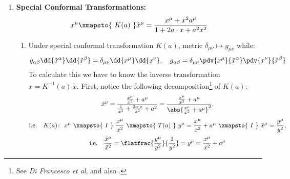 \documentclass[a4paper,10pt]{article}
\begin{document}
\begin{enumerate}
	\item \textbf{Special Conformal Transformations:}
	\begin{equation}
		x^\mu
		\xmapsto{\ K(a)\ }
		\tilde{x}^\mu
		= \frac{x^\mu + x^2 a^\mu}{
			1 + 2a\cdot x + a^2 x^2
		}
	\end{equation}
	
	\begin{enumerate}
	\item Under special conformal transformation $K(a)$, metric $\delta_{\mu\nu}\mapsto g_{\mu\nu}$ while:
	\begin{equation}
		g_{\alpha\beta}
			\dd{\tilde{x}^\alpha}
			\dd{\tilde{x}^\beta}
		= \delta_{\mu\nu}
			\dd{x^\mu}
			\dd{x^\nu},\quad
		g_{\alpha\beta}
		= \delta_{\mu\nu}
			\pdv{x^\mu}{\tilde{x}^\alpha}
			\pdv{x^\nu}{\tilde{x}^\beta}
		\label{eq:metric_transform}
	\end{equation}
	To calculate this we have to know the inverse transformation $x = K^{-1}(a)\,\tilde{x}$. First, notice the following decomposition\footnote{
		See \textit{Di Francesco et al}, and also . 
	} of $K(a)$:
	\begin{gather}
		\tilde{x}^\mu
		= \frac{\frac{x^\mu}{x^2} + a^\mu}{
			\frac{1}{x^2}
			+ \frac{2a\cdot x}{x^2} + a^2
		}
		= \frac{\frac{x^\mu}{x^2} + a^\mu}{
			\abs{\frac{x^\mu}{x^2} + a^\mu}^2
		},\\[1ex]
		\text{i.e.}\quad
		K(a)\colon\ %
			x^\mu
			\ \xmapsto{\ I\ }\ %
			\frac{x^\mu}{x^2}
			\ \xmapsto{\ T(a)\ }\ %
			y^\mu = \frac{x^\mu}{x^2} + a^\mu
			\ \xmapsto{\ I\ }\ %
			\tilde{x}^\mu
			= \frac{y^\mu}{y^2},
		\label{eq:special_conformal_decomp} \\[.5ex]
		\text{i.e.}\quad
		\frac{\tilde{x}^\mu}{\tilde{x}^2}
			= \flatfrac{
				\frac{y^\mu}{y^2}
			}{
				\frac{1}{y^2}
			}
			= y^\mu = \frac{x^\mu}{x^2} + a^\mu
		\label{eq:special_conformal_simplified}
	\end{gather}
	

\end{enumerate}
\end{enumerate}
\end{document}
